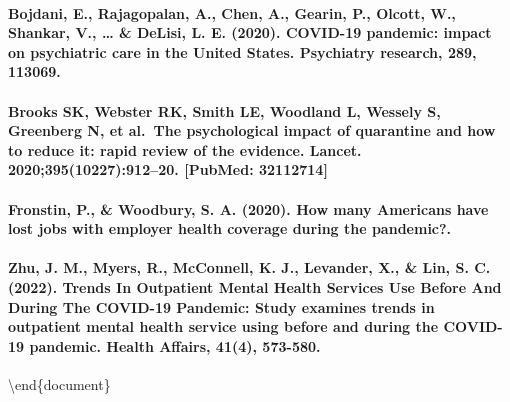 \documentclass[
  12pt,
]{article}
\begin{document}
\hypertarget{bojdani-e.-rajagopalan-a.-chen-a.-gearin-p.-olcott-w.-shankar-v.-delisi-l.-e.-2020.-covid-19-pandemic-impact-on-psychiatric-care-in-the-united-states.-psychiatry-research-289-113069.}{%
\paragraph{Bojdani, E., Rajagopalan, A., Chen, A., Gearin, P., Olcott,
W., Shankar, V., \ldots{} \& DeLisi, L. E. (2020). COVID-19 pandemic:
impact on psychiatric care in the United States. Psychiatry research,
289,
113069.}\label{bojdani-e.-rajagopalan-a.-chen-a.-gearin-p.-olcott-w.-shankar-v.-delisi-l.-e.-2020.-covid-19-pandemic-impact-on-psychiatric-care-in-the-united-states.-psychiatry-research-289-113069.}}

\hypertarget{brooks-sk-webster-rk-smith-le-woodland-l-wessely-s-greenberg-n-et-al.-the-psychological-impact-of-quarantine-and-how-to-reduce-it-rapid-review-of-the-evidence.-lancet.-20203951022791220.-pubmed-32112714}{%
\paragraph{Brooks SK, Webster RK, Smith LE, Woodland L, Wessely S,
Greenberg N, et al.~The psychological impact of quarantine and how to
reduce it: rapid review of the evidence. Lancet.
2020;395(10227):912--20. {[}PubMed:
32112714{]}}\label{brooks-sk-webster-rk-smith-le-woodland-l-wessely-s-greenberg-n-et-al.-the-psychological-impact-of-quarantine-and-how-to-reduce-it-rapid-review-of-the-evidence.-lancet.-20203951022791220.-pubmed-32112714}}

\hypertarget{fronstin-p.-woodbury-s.-a.-2020.-how-many-americans-have-lost-jobs-with-employer-health-coverage-during-the-pandemic.}{%
\paragraph{Fronstin, P., \& Woodbury, S. A. (2020). How many Americans
have lost jobs with employer health coverage during the
pandemic?.}\label{fronstin-p.-woodbury-s.-a.-2020.-how-many-americans-have-lost-jobs-with-employer-health-coverage-during-the-pandemic.}}

\hypertarget{zhu-j.-m.-myers-r.-mcconnell-k.-j.-levander-x.-lin-s.-c.-2022.-trends-in-outpatient-mental-health-services-use-before-and-during-the-covid-19-pandemic-study-examines-trends-in-outpatient-mental-health-service-using-before-and-during-the-covid-19-pandemic.-health-affairs-414-573-580.}{%
\paragraph{Zhu, J. M., Myers, R., McConnell, K. J., Levander, X., \&
Lin, S. C. (2022). Trends In Outpatient Mental Health Services Use
Before And During The COVID-19 Pandemic: Study examines trends in
outpatient mental health service using before and during the COVID-19
pandemic. Health Affairs, 41(4),
573-580.}\label{zhu-j.-m.-myers-r.-mcconnell-k.-j.-levander-x.-lin-s.-c.-2022.-trends-in-outpatient-mental-health-services-use-before-and-during-the-covid-19-pandemic-study-examines-trends-in-outpatient-mental-health-service-using-before-and-during-the-covid-19-pandemic.-health-affairs-414-573-580.}}

\textbackslash end\{document\}
\end{document}
